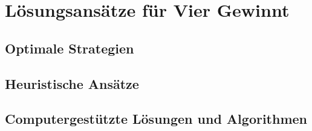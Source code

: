 \chapter{Lösungsansätze für Vier Gewinnt}

\section{Optimale Strategien}
\section{Heuristische Ansätze}
\section{Computergestützte Lösungen und Algorithmen}
	